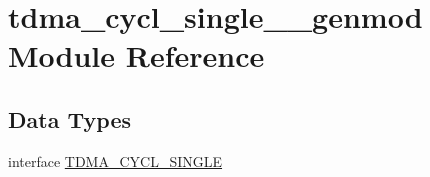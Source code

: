 \hypertarget{namespacetdma__cycl__single____genmod}{}\section{tdma\+\_\+cycl\+\_\+single\+\_\+\+\_\+genmod Module Reference}
\label{namespacetdma__cycl__single____genmod}
\subsection*{Data Types}
\begin{DoxyCompactItemize}
\item 
interface \mbox{\hyperlink{interfacetdma__cycl__single____genmod_1_1_t_d_m_a___c_y_c_l___s_i_n_g_l_e}{T\+D\+M\+A\+\_\+\+C\+Y\+C\+L\+\_\+\+S\+I\+N\+G\+LE}}
\end{DoxyCompactItemize}
